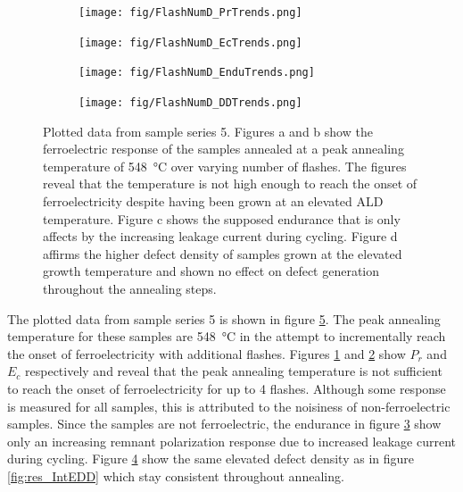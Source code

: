 \documentclass[11pt,twoside]{eitExjobb}
\begin{document}
\begin{figure}[htbp]
    \centering
    \begin{subfigure}{.4\linewidth}
        \texttt{[image: fig/FlashNumD\_PrTrends.png]}
        \caption{}\label{fig:res_NumDPr}
    \end{subfigure}
    \begin{subfigure}{.4\linewidth}
        \texttt{[image: fig/FlashNumD\_EcTrends.png]}
        \caption{}\label{fig:res_NumDEc}
    \end{subfigure}
    \begin{subfigure}{.4\linewidth}
        \texttt{[image: fig/FlashNumD\_EnduTrends.png]}
        \caption{}\label{fig:res_NumDEndu}
    \end{subfigure}
    \begin{subfigure}{.4\linewidth}
        \texttt{[image: fig/FlashNumD\_DDTrends.png]}
        \caption{}\label{fig:res_NumDDD}    
    \end{subfigure}
    \caption{Plotted data from sample series 5. Figures a and b show the
    ferroelectric response of the samples annealed at a peak annealing
    temperature of \SI{548}{\celsius} over varying number of flashes. The figures
    reveal that the temperature is not high enough to reach the onset of
    ferroelectricity despite having been grown at an elevated ALD temperature.
    Figure c shows the supposed endurance that is only affects by the increasing
    leakage current during cycling. Figure d affirms the higher defect density of
    samples grown at the elevated growth temperature and shown no effect on defect
    generation throughout the annealing steps.}\label{fig:res_NumD}
\end{figure}

The plotted data from sample series 5 is shown in figure \ref{fig:res_NumD}. The
peak annealing temperature for these samples are \SI{548}{\celsius} in the
attempt to incrementally reach the onset of ferroelectricity with additional
flashes. Figures \ref{fig:res_NumDPr} and \ref{fig:res_NumDEc} show $P_r$ and
$E_c$ respectively and reveal that the peak annealing temperature is not
sufficient to reach the onset of ferroelectricity for up to 4 flashes. Although
some response is measured for all samples, this is attributed to the noisiness
of non-ferroelectric samples. Since the samples are not ferroelectric, the
endurance in figure \ref{fig:res_NumDEndu} show only an increasing remnant
polarization response due to increased leakage current during cycling. Figure
\ref{fig:res_NumDDD} show the same elevated defect density as in figure
\ref{fig:res_IntEDD} which stay consistent throughout annealing.
\end{document}
